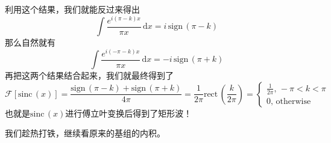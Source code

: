 \documentclass[12pt,a4paper,openany,twoside]{book}
\numberwithin{equation}{section}
\newcommand{\sinc}[1]{\mathrm{sinc} \, (#1)}
\begin{document}
        利用这个结果，我们就能反过来得出
        \begin{equation}
      	  \int \frac{e^{i(\pi-k)x}}{\pi x} \, \mathrm{d}x =  i \, \mathrm{sign}\, (\pi-k) 
        \end{equation}
        那么自然就有
        \begin{equation}
      	  \int \frac{e^{i(-\pi-k)x}}{\pi x} \, \mathrm{d}x = - i \,\mathrm{sign}\, (\pi + k) 
        \end{equation}
        再把这两个结果结合起来，我们就最终得到了
        \begin{equation}
      	  \mathcal{F}[\sinc{x}] = \frac{\mathrm{sign}\,(\pi-k)+ \mathrm{sign}\,(\pi+k)}{4 \pi}= \frac{1}{2 \pi}\mathrm{rect}\, (\frac{k}{2\pi}) =
      	  \begin{cases}
      		   \frac{1}{2\pi}, \, -\pi < k < \pi \\
      		  0, \, \text{otherwise}
      	  \end{cases}
        \end{equation}
        也就是$\sinc{x}$进行傅立叶变换后得到了矩形波！

        我们趁热打铁，继续看原来的基组的内积。
\end{document}
